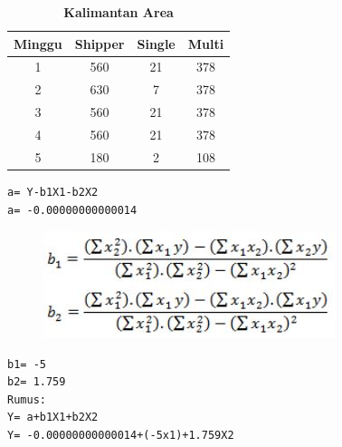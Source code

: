 \begin{enumerate}
\begin{table}[!ht]
  \centering
  \caption{\textbf{Kalimantan Area}}
\begin{tabular}{|c|c|c|c|}
\hline
Minggu & Shipper & Single & Multi \\ \hline
1      & 560     & 21     & 378   \\ \hline
2      & 630     & 7     & 378   \\ \hline
3      & 560     & 21     & 378   \\ \hline
4      & 560     & 21     & 378   \\ \hline
5      & 180     & 2     & 108   \\ \hline
\end{tabular}
\end{table}
\begin{lstlisting}
a= Y-b1X1-b2X2      
a= -0.00000000000014
\end{lstlisting}
\begin{figure}[!ht]
\includegraphics[scale=0.6]{figures/b1b2.JPG}
    \label{Figure4}
\end{figure}
\begin{lstlisting}
b1= -5
b2= 1.759
Rumus:
Y= a+b1X1+b2X2
Y= -0.00000000000014+(-5x1)+1.759X2
\end{lstlisting}


\end{enumerate}
